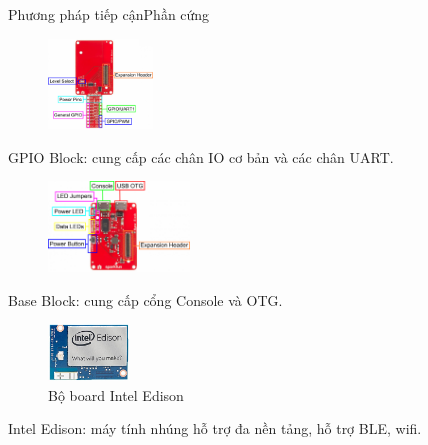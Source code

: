 \documentclass[compress, blue, 13pt,hyperref={pdfpagemode=FullScreen}]{beamer}
\begin{document}
\begin{frame}{Phương pháp tiếp cận}{Phần cứng}
\begin{multicols}{2}
\begin{figure}[hbtp]
\centering
\includegraphics[height = 2.4cm]{images/GPIOBlockAnnotated.png}
\end{figure}
\columnbreak 

GPIO Block: cung cấp các chân IO cơ bản và các chân UART.
\end{multicols}
\begin{multicols}{2}
\begin{figure}[hbtp]
\centering
\includegraphics[height = 2.4cm]{images/BaseAnnotated.png}
\end{figure}
\columnbreak 

Base Block: cung cấp cổng Console và OTG.
\end{multicols}
\begin{multicols}{2}
\begin{figure}[hbtp]
\centering
\includegraphics[height = 1.5cm]{images/MakerBoards-Edison.jpg}
\caption{Bộ board Intel Edison}
\end{figure}
\columnbreak 

Intel Edison: máy tính nhúng hỗ trợ đa nền tảng, hỗ trợ BLE, wifi.
\end{multicols}
\end{frame}
\end{document}
